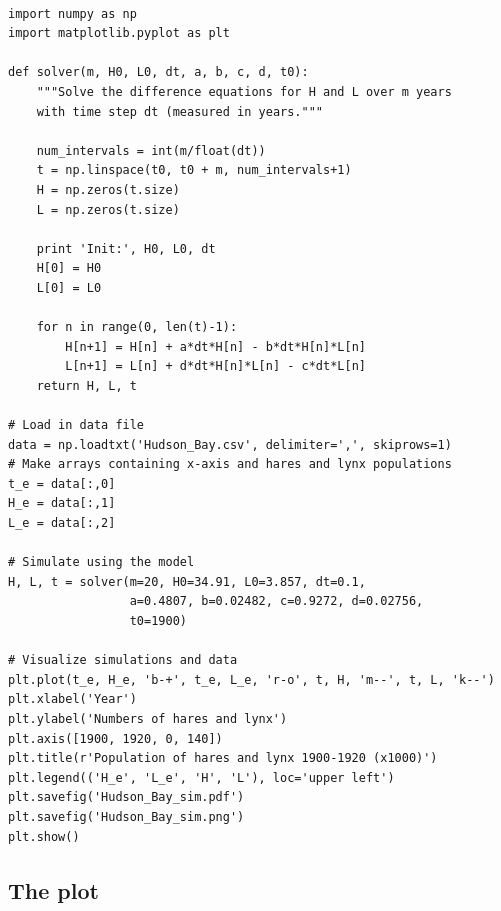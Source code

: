 \documentclass[%
oneside,                 %
final,                   %
10pt]{article}
\begin{document}
\paragraph{}
\begin{verbatim}
import numpy as np
import matplotlib.pyplot as plt

def solver(m, H0, L0, dt, a, b, c, d, t0):
    """Solve the difference equations for H and L over m years
    with time step dt (measured in years."""

    num_intervals = int(m/float(dt))
    t = np.linspace(t0, t0 + m, num_intervals+1)
    H = np.zeros(t.size)
    L = np.zeros(t.size)

    print 'Init:', H0, L0, dt
    H[0] = H0
    L[0] = L0

    for n in range(0, len(t)-1):
        H[n+1] = H[n] + a*dt*H[n] - b*dt*H[n]*L[n]
        L[n+1] = L[n] + d*dt*H[n]*L[n] - c*dt*L[n]
    return H, L, t

# Load in data file
data = np.loadtxt('Hudson_Bay.csv', delimiter=',', skiprows=1)
# Make arrays containing x-axis and hares and lynx populations
t_e = data[:,0]
H_e = data[:,1]
L_e = data[:,2]

# Simulate using the model
H, L, t = solver(m=20, H0=34.91, L0=3.857, dt=0.1,
                 a=0.4807, b=0.02482, c=0.9272, d=0.02756,
                 t0=1900)

# Visualize simulations and data
plt.plot(t_e, H_e, 'b-+', t_e, L_e, 'r-o', t, H, 'm--', t, L, 'k--')
plt.xlabel('Year')
plt.ylabel('Numbers of hares and lynx')
plt.axis([1900, 1920, 0, 140])
plt.title(r'Population of hares and lynx 1900-1920 (x1000)')
plt.legend(('H_e', 'L_e', 'H', 'L'), loc='upper left')
plt.savefig('Hudson_Bay_sim.pdf')
plt.savefig('Hudson_Bay_sim.png')
plt.show()
\end{verbatim}



\subsection*{The plot}



\vspace{6mm}
\end{document}
